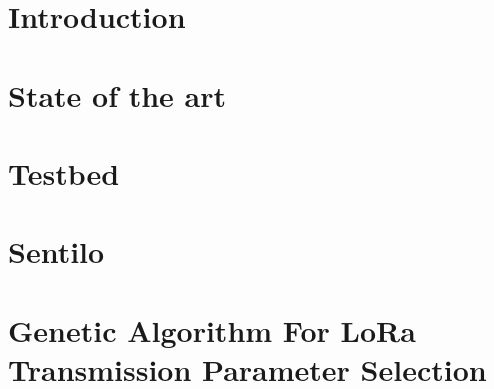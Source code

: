 \documentclass[conference]{IEEEtran}
\begin{document}
\begin{refsection}

\preface
\body

\chapter[1:''The secret of a good sermon is to have a good beginning and a good ending, then trying to have the two as close as possible.'' - George Burns]{Introduction}
	
\chapter[0:''Given one hour to save the planet, I would spend 59 minutes understanding the problem and one minute resolving it.'' - Albert Einstein]{State of the art}
	
	
	
	
	
	
\chapter[1:''Human identity is no longer defined by what one does, but by what one owns. This is not a message of happiness or reassurance, but it is the truth and it is a warning.'' - Jimmy Carter]{Testbed}
	
	
	
	
	
	
	
	
\chapter[2:''Qu'importe d'où viennent les questions, l'essentiel est d'où partent les réponses.'' - Slimane Benaïssa]{Sentilo}
	
	
	
	
	
	
	
	
\chapter[4:''I know what to do and I go and execute'' - Usain Bolt]{Genetic Algorithm For LoRa Transmission Parameter Selection}
	
	
	
	
	
	

\end{refsection}
\end{document}
